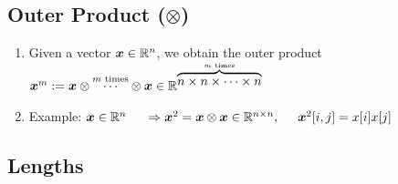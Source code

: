 \subsection{Outer Product ($\otimes$)}

\begin{enumerate}
    \item Given a vector $\bm{x} \in \mathbb{R}^n$, we obtain the outer product $\bm{x}^m := \bm{x} \otimes \overset{m \text{ times}}{\cdots} \otimes \bm{x} \in \mathbb{R}^{\overset{m \text{ times}}{\overbrace{n \times n \times \cdots \times n}}}$
    \hfill \cite{mfml/book/mml/Deisenroth-Faisal-Ong}

    \item Example: 
    $
        \bm{x} \in \mathbb{R}^n 
        \hspace{0.5cm}
        \Rightarrow \bm{x}^2 = \bm{x} \otimes \bm{x} \in \mathbb{R}^{n\times n}, 
        \hspace{0.5cm}
        \bm{x}^2[i, j] = x[i]x[j]
    $
    \hfill \cite{mfml/book/mml/Deisenroth-Faisal-Ong}
\end{enumerate}






\subsection{Lengths}

